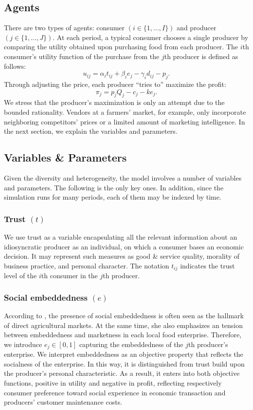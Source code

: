 \documentclass[11pt, oneside]{article}
\begin{document}
\subsection{Agents}
There are two types of agents: consumer $(i \in \{1,...,I\})$ and producer $(j \in \{1,...,J\})$. At each period, a typical consumer chooses a single producer by comparing the utility obtained upon purchasing food from each producer. The $i$th consumer's utility function of the purchase from the $j$th producer is defined as follows:
\begin{equation} \label{util}
  u_{ij} = \alpha_i t_{ij} + \beta_i e_j - \gamma_i d_{ij} - p_j .
\end{equation}
Through adjusting the price, each producer ``tries to'' maximize the profit:
\begin{equation}  \label{profit}
  \pi_j = p_j Q_j - c_j - k e_j .
\end{equation}
We stress that the producer's maximization is only an attempt due to the bounded rationality. Vendors at a farmers' market, for example, only incorporate neighboring competitors' prices or a limited amount of marketing intelligence. In the next section, we explain the variables and parameters.

\subsection{Variables \& Parameters}
Given the diversity and heterogeneity, the model involves a number of variables and parameters. The following is the only key ones. In addition, since the simulation runs for many periods, each of them may be indexed by time.

\subsubsection{Trust $(t)$}
We use trust as a variable encapsulating all the relevant information about an idiosyncratic producer as an individual, on which a consumer bases an economic decision. It may represent such measures as good \& service quality, morality of business practice, and personal character. The notation $t_{ij}$ indicates the trust level of the $i$th consumer in the $j$th producer.

\subsubsection{Social embeddedness $(e)$}
According to \textcite{Hinrichs2000}, the presence of social embeddedness is often seen as the hallmark of direct agricultural markets. At the same time, she also emphasizes an tension between embeddedness and marketness in each local food enterprise. Therefore, we introduce $e_j \in [0,1]$ capturing the embeddedness of the $j$th producer's enterprise. We interpret embeddedness as an objective property that reflects the socialness of the enterprise. In this way, it is distinguished from trust build upon the producer's personal characteristic. As a result, it enters into both objective functions, positive in utility and negative in profit, reflecting respectively consumer preference toward social experience in economic transaction and producers' customer maintenance costs.
\end{document}

